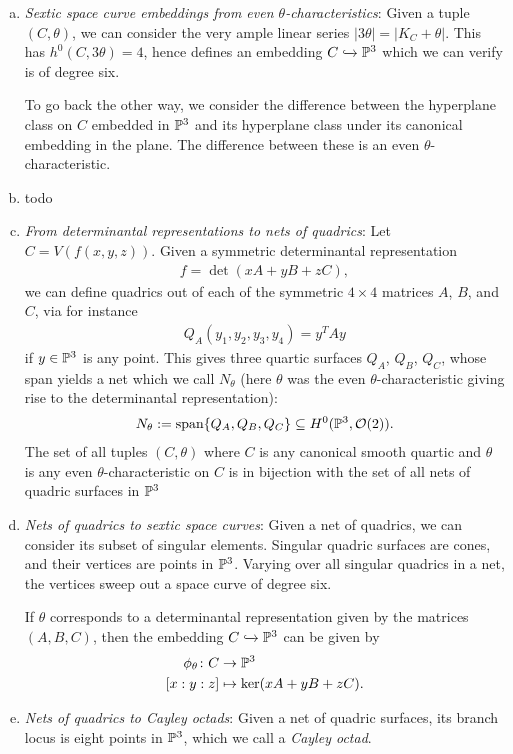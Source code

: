 \documentclass[11pt]{amsart}
\begin{document}
\begin{enumerate}[(a)]
\item \textit{Sextic space curve embeddings from even $\theta$-characteristics}: Given a tuple $(C,\theta)$, we can consider the very ample linear series $|3\theta| = |K_C+\theta|$. This has $h^0(C,3\theta) = 4$, hence defines an embedding $C \hookto \P^3$ which we can verify is of degree six.

To go back the other way, we consider the difference between the hyperplane class on $C$ embedded in $\P^3$ and its hyperplane class under its canonical embedding in the plane. The difference between these is an even $\theta$-characteristic.

\item todo

\item \textit{From determinantal representations to nets of quadrics}: Let $C = V(f(x,y,z))$. Given a symmetric determinantal representation
\begin{align*}
    f = \det \left( xA + yB + zC \right),
\end{align*}
we can define quadrics out of each of the symmetric $4 \times 4$ matrices $A$, $B$, and $C$, via for instance
\begin{align*}
    Q_A(y_1, y_2, y_3, y_4) = y^T A y
\end{align*}
if $y\in \P^3$ is any point. This gives three quartic surfaces $Q_A$, $Q_B$, $Q_C$, whose span yields a net which we call $N_\theta$ (here $\theta$ was the even $\theta$-characteristic giving rise to the determinantal representation):
\begin{align*}
    N_\theta := \text{span}\{Q_A,Q_B,Q_C\} \subseteq H^0(\P^3, \O(2)).
\end{align*}
%
The set of all tuples $(C,\theta)$ where $C$ is any canonical smooth quartic and $\theta$ is any even $\theta$-characteristic on $C$ is in bijection with the set of all nets of quadric surfaces in $\P^3$ \cite[6.3]{GrossHarris-theta}

\item \textit{Nets of quadrics to sextic space curves}: Given a net of quadrics, we can consider its subset of singular elements. Singular quadric surfaces are cones, and their vertices are points in $\P^3$. Varying over all singular quadrics in a net, the vertices sweep out a space curve of degree six.

If $\theta$ corresponds to a determinantal representation given by the matrices $(A,B,C)$, then the embedding $C \hookto \P^3$ can be given by
\begin{align*}
    \phi_\theta \colon C &\to \P^3 \\
    [x:y:z] &\mapsto \ker(xA+yB+zC).
\end{align*}
%
\item \textit{Nets of quadrics to Cayley octads}: Given a net of quadric surfaces, its branch locus is eight points in $\P^3$, which we call a \textit{Cayley octad}.
\end{enumerate}
\end{document}
